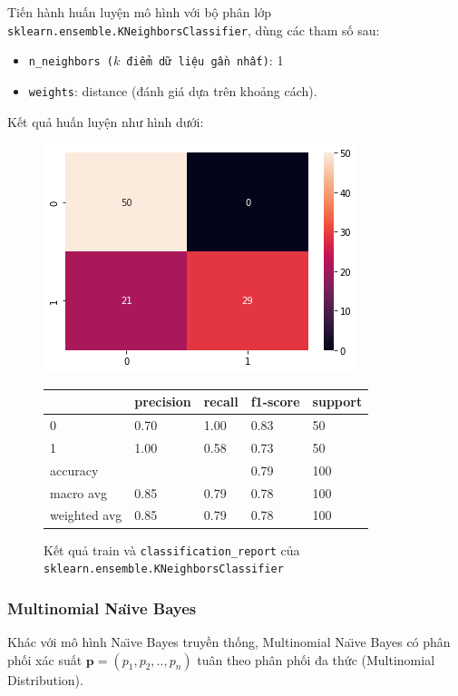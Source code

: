 \documentclass[12pt]{article}
\begin{document}
Tiến hành huấn luyện mô hình với bộ phân lớp \texttt{sklearn.ensemble.KNeighborsClassifier}, dùng các tham số sau:
\begin{itemize}
\item \texttt{n\_neighbors ($k$ điểm dữ liệu gần nhất)}: 1
\item \texttt{weights}: distance (đánh giá dựa trên khoảng cách).
\end{itemize}
Kết quả huấn luyện như hình dưới:
\begin{figure}[H]
	\begin{multicols}{2}
		\includegraphics[scale=.5]{img/train-knn-result.png}

		\begin{table}[H]
			\begin{tabular}{l l l l l}
				\hline
				& precision & recall & f1-score & support \\
				\hline
				0 & 0.70 & 1.00 & 0.83 & 50 \\
				1 & 1.00 & 0.58 & 0.73 & 50 \\
				accuracy &   &   & 0.79 & 100 \\
				macro avg & 0.85 & 0.79 & 0.78 & 100 \\
				weighted avg & 0.85 & 0.79 & 0.78 & 100 \\
				\hline
			\end{tabular}
		\end{table}
	\end{multicols}
	\caption{Kết quả train và \texttt{classification\_report} của \texttt{sklearn.ensemble.KNeighborsClassifier}}
\end{figure}

\subsubsection{Multinomial Na\"{\i}ve Bayes}
Khác với mô hình Na\"{\i}ve Bayes truyền thống, Multinomial Na\"{\i}ve Bayes có phân phối xác suất $\mathbf{p} = (p_1, p_2, .., p_n)$ tuân theo phân phối đa thức (Multinomial Distribution).
\end{document}
